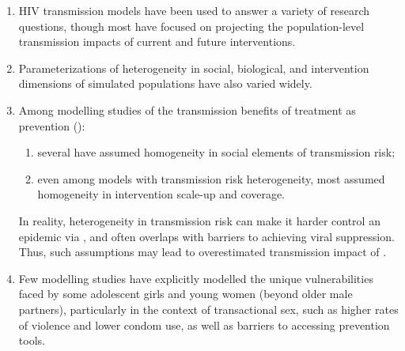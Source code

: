 \begin{enumerate}
  \item HIV transmission models have been used to answer a variety of research questions,
        though most have focused on projecting the population-level transmission
        impacts of current and future interventions.
  \item Parameterizations of heterogeneity in social, biological, and intervention dimensions
        of simulated populations have also varied widely.
  \item Among modelling studies of the transmission benefits of \art treatment as prevention (\tasp):
  \begin{enumerate}
    \item several have assumed homogeneity in social elements of transmission risk;
    \item even among models with transmission risk heterogeneity, most assumed
          homogeneity in intervention scale-up and coverage.
  \end{enumerate}
        In reality, heterogeneity in transmission risk
        can make it harder control an epidemic via \tasp,
        and often overlaps with barriers to achieving viral suppression.
        Thus, such assumptions may lead to overestimated transmission impact of \tasp.
  \item Few modelling studies have explicitly modelled the unique vulnerabilities faced by
        some adolescent girls and young women (beyond older male partners),
        particularly in the context of transactional sex, such as
        higher rates of violence and lower condom use, as well as
        barriers to accessing prevention tools.
\end{enumerate}